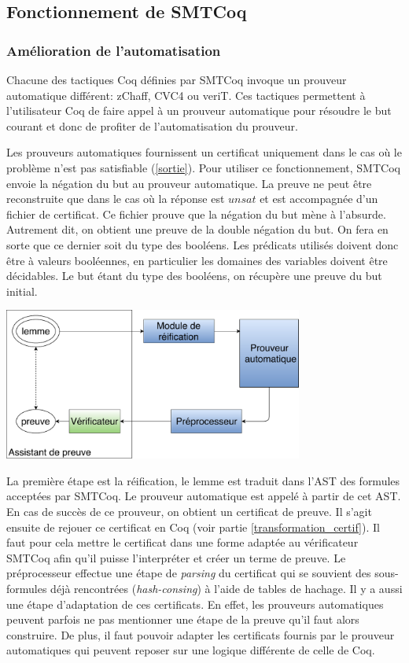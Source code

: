 \documentclass[11pt]{article}
\begin{document}
\subsection{Fonctionnement de SMTCoq}

\subsubsection{Amélioration de l'automatisation}\label{negation}

Chacune des tactiques Coq définies par SMTCoq invoque un prouveur automatique différent: zChaff, CVC4 ou veriT. Ces tactiques permettent à l'utilisateur Coq de faire appel à un prouveur automatique pour résoudre le but courant et donc de profiter de l'automatisation du prouveur. \medbreak



Les prouveurs automatiques fournissent un certificat uniquement dans le cas où le problème n'est pas satisfiable (\ref{sortie}). Pour utiliser ce fonctionnement, SMTCoq envoie la négation du but au prouveur automatique. La preuve ne peut être reconstruite que dans le cas où la réponse est $unsat$ et est accompagnée d'un fichier de certificat. Ce fichier prouve que la négation du but mène à l'absurde. Autrement dit, on obtient une preuve de la double négation du but. On fera en sorte que ce dernier soit du type des booléens. Les prédicats utilisés doivent donc être à valeurs booléennes, en particulier les domaines des variables doivent être décidables.  Le but étant du type des booléens, on récupère une preuve du but initial.

\begin{center}
    \includegraphics[height=5cm]{Automatisation.pdf}
\end{center}

La première étape est la réification, le lemme est traduit dans l'AST des formules acceptées par SMTCoq. Le prouveur automatique est appelé à partir de cet AST. En cas de succès de ce prouveur, on obtient un certificat de preuve. 
Il s'agit ensuite de rejouer ce certificat en Coq (voir partie \ref{transformation_certif}). Il faut pour cela mettre le certificat dans une forme adaptée au vérificateur SMTCoq afin qu'il puisse l'interpréter et créer un terme de preuve. Le préprocesseur effectue une étape de \textit{parsing} du certificat qui se souvient des sous-formules déjà rencontrées (\textit{hash-consing}) à l'aide de tables de hachage.  Il y a aussi une étape d'adaptation de ces certificats. En effet, les prouveurs automatiques peuvent parfois ne pas mentionner une étape de la preuve qu'il faut alors construire. De plus, il faut pouvoir adapter les certificats fournis par le prouveur automatiques qui peuvent reposer sur une logique différente de celle de Coq. 
\end{document}
